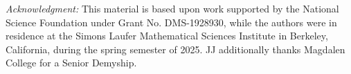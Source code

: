 \documentclass[a4paper, a4wide, 10pt, reqno]{amsart}
\theoremstyle{plain}
\theoremstyle{definition}
\numberwithin{equation}{section}
\begin{document}
\emph{Acknowledgment:}
This material is based upon work supported by the National Science Foundation under Grant No. DMS-1928930, while the authors were in residence at the Simons Laufer Mathematical Sciences Institute in Berkeley, California, during the spring semester of 2025. JJ additionally thanks Magdalen College for a Senior Demyship.





\end{document}
